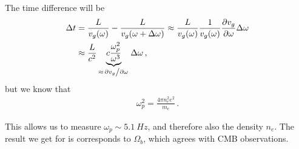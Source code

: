 \documentclass[main.tex]{subfiles}
\begin{document}
The time difference will be 
%
\begin{subequations}
\begin{align}
\Delta t &= \frac{L}{v_g (\omega)} - \frac{L}{v_g (\omega + \Delta \omega )} 
\approx \frac{L}{v_g(\omega )} \frac{1}{v_g(\omega )}\pdv{v_g}{\omega } \Delta \omega  \\
&\approx \frac{L}{c^2} \underbrace{c \frac{\omega _p^2}{\omega^3}}_{\approx \pdv*{v_g}{\omega }} \Delta \omega 
\,,
\end{align}
\end{subequations}
%
but we know that 
%
\begin{align}
\omega _p^2 = \frac{ 4 \pi n_e^2 e^2}{m_e}
\,.
\end{align}

This allows us to measure \(\omega _p \sim \SI{5.1}{Hz}\), and therefore also the density \(n_e\). 
The result we get for is corresponds to \(\Omega _b\), which agrees with CMB observations. 
\end{document}
